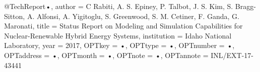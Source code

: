 @TechReport{•,
author = {C Rabiti, A. S. Epiney, P. Talbot, J. S. Kim, S. Bragg-Sitton, A. Alfonsi, A. Yigitoglu, S. Greenwood, S. M. Cetiner, F. Ganda, G. Maronati},
title = {Status Report on Modeling and Simulation Capabilities for Nuclear-Renewable Hybrid Energy Systems},
institution = {Idaho National Laboratory},
year = {2017},
OPTkey = {•},
OPTtype = {•},
OPTnumber = {•},
OPTaddress = {•},
OPTmonth = {•},
OPTnote = {•},
OPTannote = {INL/EXT-17-43441}
}
